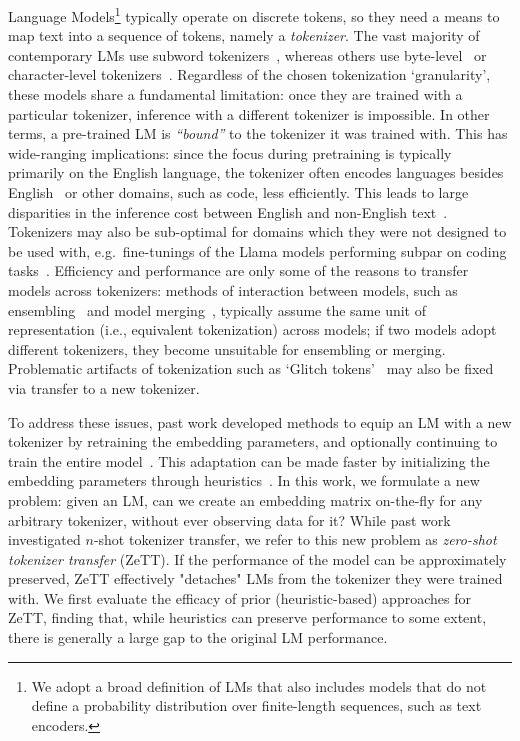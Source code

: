 \documentclass{article}
\begin{document}
Language Models\footnote{We adopt a broad definition of LMs that also includes models that do not define a probability distribution over finite-length sequences, such as text encoders.} typically operate on discrete tokens, so they need a means to map text into a sequence of tokens, namely a \textit{tokenizer}. The vast majority of contemporary LMs use subword tokenizers~\citep[][among others]{devlin-etal-2019-bert,jiang2023mistral,touvron2023llama,parmar2024nemotron4}, whereas others use byte-level~\citep{xue-etal-2022-byt5,yu2023megabyte,wang2024mambabyte} or character-level tokenizers~\citep{clark-etal-2022-canine,tay2022charformer}. Regardless of the chosen tokenization `granularity', these models share a fundamental limitation: once they are trained with a particular tokenizer, inference with a different tokenizer is impossible. In other terms, a pre-trained LM is \textit{``bound''} to the tokenizer it was trained with. This has wide-ranging implications: since the focus during pretraining is typically primarily on the English language, the tokenizer often encodes languages besides English~\citep{rust-etal-2021-good} or other domains, such as code, less efficiently.
This leads to large disparities in the inference cost between English and non-English text~\citep{ahia-etal-2023-languages,petrov2023language}. Tokenizers may also be sub-optimal for domains which they were not designed to be used with, e.g.\ fine-tunings of the Llama models performing subpar on coding tasks~\citep{dagan2024getting}. Efficiency and performance are only some of the reasons to transfer models across tokenizers: methods of interaction between models, such as ensembling~\citep{sagi2018ensemble} and model merging~\citep{pmlr-v162-wortsman22a,ainsworth2023git,yadav2023tiesmerging}, typically assume the same unit of representation (i.e., equivalent tokenization) across models; if two models adopt different tokenizers, they become unsuitable for ensembling or merging. Problematic artifacts of tokenization such as `Glitch tokens'~\citep{land2024fishing} may also be fixed via transfer to a new tokenizer.

To address these issues, past work developed methods to equip an LM with a new tokenizer by retraining the embedding parameters, and optionally continuing to train the entire model~\citep{artetxe-etal-2020-cross,de-vries-nissim-2021-good}. This adaptation can be made faster by initializing the embedding parameters through heuristics~\citep{tran2020english,minixhofer-etal-2022-wechsel,gee-etal-2022-fast,dobler-de-melo-2023-focus,liu2023ofa}. In this work, we formulate a new problem: given an LM, can we create an embedding matrix on-the-fly for any arbitrary tokenizer, without ever observing data for it? While past work investigated $n$-shot tokenizer transfer, we refer to this new problem as \textit{zero-shot tokenizer transfer} (ZeTT). If the performance of the model can be approximately preserved, ZeTT effectively "detaches" LMs from the tokenizer they were trained with.
We first evaluate the efficacy of prior (heuristic-based) approaches for ZeTT, finding that, while heuristics can preserve performance to some extent, there is generally a large gap to the original LM performance.
\end{document}
